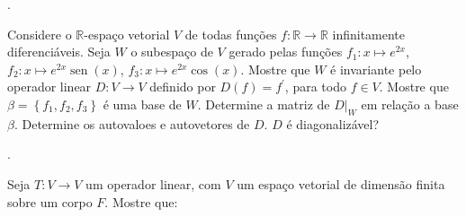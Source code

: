 \begin{questions}
	\begin{solutionordottedlines}
		.
	\end{solutionordottedlines}

	\question\label{exercício:3.7}

	Considere o $\mathbb{R}$-espaço vetorial $V$ de todas funções
	$f\colon\mathbb{R}\to\mathbb{R}$ infinitamente diferenciáveis.
	Seja $W$ o subespaço de $V$ gerado pelas funções
	$f_{1}\colon x\mapsto e^{2x}$,
	$f_{2}\colon x\mapsto e^{2x}\operatorname{sen}\left(x\right)$,
	$f_{3}\colon x\mapsto e^{2x}\cos\left(x\right)$.
	Mostre que $W$ é invariante pelo operador linear $D\colon V \to V$
	definido por $D\left(f\right)=f^{\prime}$, para todo $f\in V$.
	Mostre que $\beta=\left\{f_{1},f_{2},f_{3}\right\}$ é uma base de
	$W$.
	Determine a matriz de ${\left.D\right|}_{W}$ em relação a base
	$\beta$.
	Determine os autovaloes e autovetores de $D$.
	$D$ é diagonalizável?

	\begin{solutionordottedlines}
		.
	\end{solutionordottedlines}

	\question\label{exercício:3.8}
	Seja $T\colon V\to V$ um operador linear, com $V$ um espaço
	vetorial de dimensão finita sobre um corpo $F$.
	Mostre que:

	\begin{solutionordottedlines}
		\begin{parts}
			\part

			\part
		\end{parts}
	\end{solutionordottedlines}


\end{questions}
